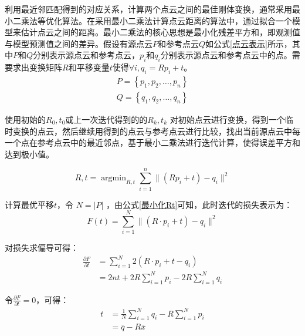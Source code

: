 利用最近邻匹配得到的对应关系，计算两个点云之间的最佳刚体变换，通常采用最小二乘法等优化算法。在采用最小二乘法计算点云距离的算法中，通过拟合一个模型来估计点云之间的距离。最小二乘法的核心思想是最小化残差平方和，即观测值与模型预测值之间的差异。假设有源点云$P$和参考点云$Q$如公式\eqref{点云表示}所示，其中$P$和$Q$分别表示源点云和参考点云，$p_i$和$q_i$分别表示源点云和参考点云中的点。需要求出变换矩阵$R$和平移变量$t$使得$\forall i, q_i=Rp_i + t$。
\begin{equation}
	\label{点云表示}
	\begin{split}
		P =  \left\lbrace p_1, p_2,\ldots,p_n \right\rbrace\\
		Q =  \left\lbrace q_1, q_2,\ldots,q_n \right\rbrace
	\end{split}
\end{equation}

使用初始的$R_0,t_0$或上一次迭代得到的的$R_k,t_k$ 对初始点云进行变换，得到一个临时变换的点云，然后继续用得到的点云与参考点云进行比较，找出当前源点云中每一个点在参考点云中的最近邻点，基于最小二乘法进行迭代计算，使得误差平方和达到极小值。

\begin{equation}
\label{最小化Rt}
R,t = \mathop{\arg\min}_{R,t}\sum_{i=1}^{n} \|\left( Rp_i+t\right) -q_i \| ^2
\end{equation}


计算最优平移$t$，令 $N=|P|$ ，由公式\eqref{最小化Rt}可知，此时迭代的损失表示为：
\begin{equation}
	\label{损失公式1}
	F(t) = \sum_{i=1}^{N} \| (R\cdot p_i + t) - q_i\|^2
\end{equation}

对损失求偏导可得：
\begin{equation}
	\label{损失公式1偏导}
	\begin{split}
		\frac{\partial F}{\partial t} &= \sum_{i=1}^{N}2(R \cdot p_i + t-q_i)\\
		&=2nt + 2R\sum_{i=1}^{N}p_i -  2R\sum_{i=1}^{N}q_i
	\end{split}
\end{equation}


令$\frac{\partial F}{\partial t} = 0$，可得：
\begin{equation}
	\label{最优平移计算}
	\begin{split}
			t &= \frac{1}{N}\sum_{i=1}^{N} q_i - R\sum_{i=1}^{N}p_i\\
		&= \bar{q} - R\bar{x}
	\end{split}
\end{equation}

